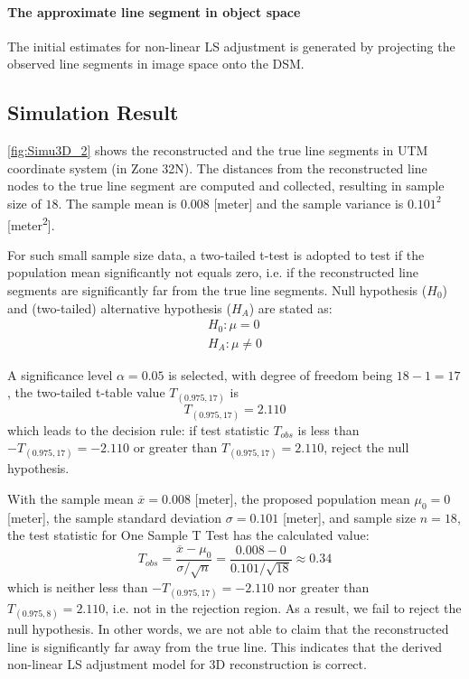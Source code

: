 \paragraph{The approximate line segment in object space}
The initial estimates for non-linear LS adjustment is generated by projecting the observed line segments in image space onto the DSM.

\clearpage

\subsection{Simulation Result}
\label{subsec:simuresult}

\cref{fig:Simu3D_2} shows the reconstructed and the true line segments in UTM coordinate system (in Zone 32N). The distances from the reconstructed line nodes to the true line segment are computed and collected, resulting in sample size of $18$. The sample mean is $0.008$ [meter] and the sample variance is $0.101^2$ [meter\textsuperscript{2}]. %

For such small sample size data, a two-tailed t-test is adopted to test if the population mean significantly not equals zero, i.e. {if the reconstructed line segments are significantly far from the true line segments}. Null hypothesis ($H_0$) and (two-tailed) alternative hypothesis ($H_A$) are stated as:
\begin{equation*}
\begin{split}
H_0: \mu=0\\
H_A: \mu\neq0
\end{split}
\end{equation*}

A significance level $\alpha=0.05$ is selected, with degree of freedom being $18-1=17$, the two-tailed t-table value $T_{(0.975,17)}$ is
\begin{equation*}
T_{(0.975,17)}=2.110
\end{equation*}
which leads to the decision rule: if test statistic $T_{obs}$ is less than $-T_{(0.975,17)}=-2.110$ or greater than $T_{(0.975,17)}=2.110$, reject the null hypothesis.

With the sample mean $\overline{x}=0.008$ [meter],
the proposed population mean $\mu_0=0$ [meter],
the sample standard deviation $\sigma=0.101$ [meter],
and sample size $n=18$, the test statistic for One Sample T Test has the calculated value:
\begin{equation*}
T_{obs} = \frac{\overline{x}-\mu_0}{\sigma/\sqrt{n}}=\frac{0.008-0}{0.101/\sqrt{18}}\approx0.34
\end{equation*}
which is neither less than $-T_{(0.975,17)}=-2.110$ nor greater than $T_{(0.975,8)}=2.110$, i.e. not in the rejection region. As a result, we fail to reject the null hypothesis. In other words, {we are not able to claim that the reconstructed line is significantly far away from the true line}. This indicates that {the derived non-linear LS adjustment model for 3D reconstruction is correct}.

